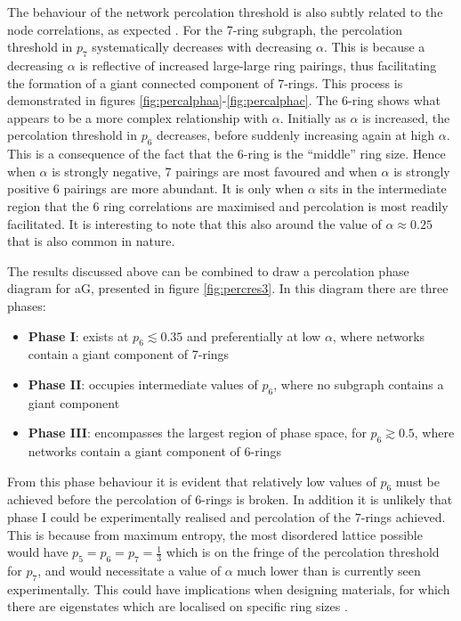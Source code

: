 The behaviour of the network percolation threshold is also subtly related to the node correlations, as expected \cite{Zhou2012,Schmeltzer2014}.
For the 7\--ring subgraph, the percolation threshold in $p_7$ systematically decreases with decreasing $\alpha$.
This is because a decreasing $\alpha$ is reflective of increased large\--large ring pairings, thus facilitating the formation of a giant connected  component of 7\--rings.
This process is demonstrated in figures \ref{fig:percalphaa}\--\ref{fig:percalphac}.
The 6\--ring shows what appears to be a more complex relationship with $\alpha$.
Initially as $\alpha$ is increased, the percolation threshold in $p_6$ decreases, before suddenly increasing again at high $\alpha$.
This is a consequence of the fact that the 6\--ring is the ``middle'' ring size. 
Hence when $\alpha$ is strongly negative, 7 pairings are most favoured and when $\alpha$ is strongly positive 6 pairings are more abundant.
It is only when $\alpha$ sits in the intermediate region that the 6 ring correlations are maximised and percolation is most readily facilitated.
It is interesting to note that this also around the value of $\alpha\approx 0.25$ that is also common in nature.

The results discussed above can be combined to draw a percolation phase diagram for aG, presented in figure \ref{fig:percres3}.
In this diagram there are three phases:
\begin{itemize}
	\item \textbf{Phase I}: exists at $p_6\lesssim 0.35$ and preferentially at low $\alpha$, where networks contain a giant component of 7\--rings
	\item \textbf{Phase II}: occupies intermediate values of $p_6$, where no subgraph contains a giant component
	\item \textbf{Phase III}: encompasses the largest region of phase space, for $p_6\gtrsim0.5$, where networks contain a giant component of 6\--rings
\end{itemize}
From this phase behaviour it is evident that relatively low values of $p_6$ must be achieved before the percolation of 6\--rings is broken.
In addition it is unlikely that phase I could be experimentally realised and percolation of the 7\--rings achieved. 
This is because from maximum entropy, the most disordered lattice possible would have $p_5=p_6=p_7=\frac{1}{3}$ which is on the fringe of the percolation threshold for $p_7$, and would necessitate a value of $\alpha$ much lower than is currently seen experimentally.
This could have implications when designing materials, for which there are eigenstates which are localised on specific ring sizes \cite{Kapko2010,Zhu2016}.




